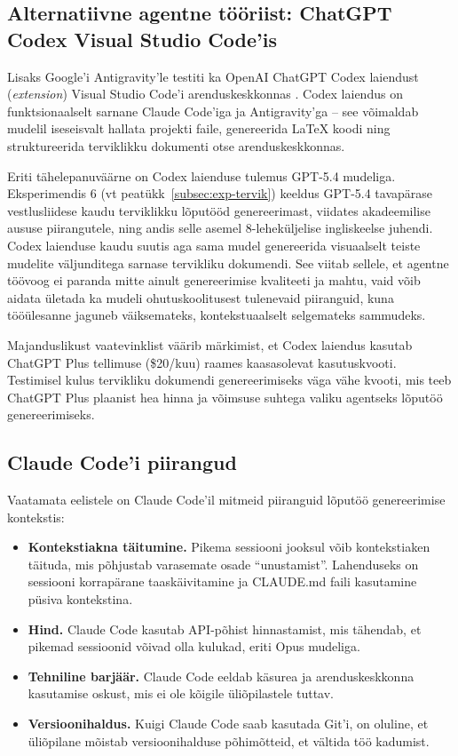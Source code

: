 \subsection{Alternatiivne agentne tööriist: ChatGPT Codex Visual Studio Code'is} \label{subsec:codex}

Lisaks Google'i Antigravity'le testiti ka OpenAI ChatGPT Codex laiendust (\textit{extension}) Visual Studio Code'i arenduskeskkonnas \cite{openai2025codex}. Codex laiendus on funktsionaalselt sarnane Claude Code'iga ja Antigravity'ga -- see võimaldab mudelil iseseisvalt hallata projekti faile, genereerida \LaTeX{} koodi ning struktureerida terviklikku dokumenti otse arenduskeskkonnas.

Eriti tähelepanuväärne on Codex laienduse tulemus GPT-5.4 mudeliga. Eksperimendis 6 (vt peatükk~\ref{subsec:exp-tervik}) keeldus GPT-5.4 tavapärase vestlusliidese kaudu terviklikku lõputööd genereerimast, viidates akadeemilise aususe piirangutele, ning andis selle asemel 8-leheküljelise ingliskeelse juhendi. Codex laienduse kaudu suutis aga sama mudel genereerida visuaalselt teiste mudelite väljunditega sarnase tervikliku dokumendi. See viitab sellele, et agentne töövoog ei paranda mitte ainult genereerimise kvaliteeti ja mahtu, vaid võib aidata ületada ka mudeli ohutuskoolitusest tulenevaid piiranguid, kuna tööülesanne jaguneb väiksemateks, kontekstuaalselt selgemateks sammudeks.

Majanduslikust vaatevinklist väärib märkimist, et Codex laiendus kasutab ChatGPT Plus tellimuse (\$20/kuu) raames kaasasolevat kasutuskvooti. Testimisel kulus tervikliku dokumendi genereerimiseks väga vähe kvooti, mis teeb ChatGPT Plus plaanist hea hinna ja võimsuse suhtega valiku agentseks lõputöö genereerimiseks.

\subsection{Claude Code'i piirangud} \label{subsec:claudecode-piirangud}

Vaatamata eelistele on Claude Code'il mitmeid piiranguid lõputöö genereerimise kontekstis:

\begin{itemize}
    \item \textbf{Kontekstiakna täitumine.} Pikema sessiooni jooksul võib kontekstiaken täituda, mis põhjustab varasemate osade ``unustamist''. Lahenduseks on sessiooni korrapärane taaskäivitamine ja CLAUDE.md faili kasutamine püsiva kontekstina.
    \item \textbf{Hind.} Claude Code kasutab API-põhist hinnastamist, mis tähendab, et pikemad sessioonid võivad olla kulukad, eriti Opus mudeliga.
    \item \textbf{Tehniline barjäär.} Claude Code eeldab käsurea ja arenduskeskkonna kasutamise oskust, mis ei ole kõigile üliõpilastele tuttav.
    \item \textbf{Versioonihaldus.} Kuigi Claude Code saab kasutada Git'i, on oluline, et üliõpilane mõistab versioonihalduse põhimõtteid, et vältida töö kadumist.
\end{itemize}

